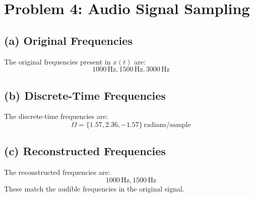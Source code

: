 \documentclass[12pt]{article}
\begin{document}
\section{Problem 4: Audio Signal Sampling}
\subsection*{(a) Original Frequencies}
The original frequencies present in \(x(t)\) are:
\[
1000 \, \text{Hz}, 1500 \, \text{Hz}, 3000 \, \text{Hz}
\]

\subsection*{(b) Discrete-Time Frequencies}
The discrete-time frequencies are:
\[
\Omega = \{1.57, 2.36, -1.57\} \, \text{radians/sample}
\]

\subsection*{(c) Reconstructed Frequencies}
The reconstructed frequencies are:
\[
1000 \, \text{Hz}, 1500 \, \text{Hz}
\]
These match the audible frequencies in the original signal.
\end{document}
